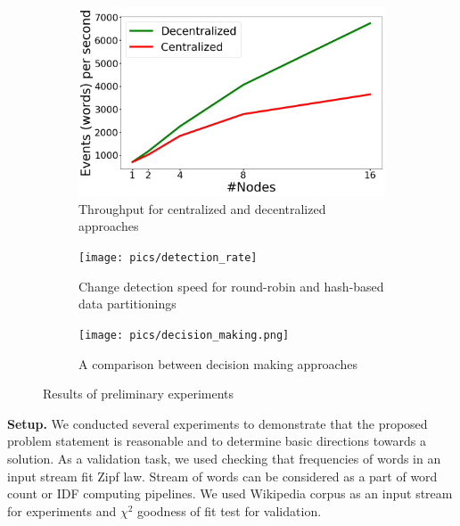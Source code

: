 \label {fs-short-experiments}

\begin{figure}[t!]
    \begin{subfigure}[b]{0.31\textwidth}
            \includegraphics[width=\linewidth]{pics/throughput}
            \caption{Throughput for centralized and decentralized approaches}
            \label{throughput}
    \end{subfigure}%
    \hspace{5mm}
    \begin{subfigure}[b]{0.31\textwidth}
            \texttt{[image: pics/detection\_rate]}
            \caption{Change detection speed for round-robin and hash-based data partitionings}
            \label{detection_rate}
    \end{subfigure}%
    \hspace{5mm}
    \begin{subfigure}[b]{0.31\textwidth}
            \texttt{[image: pics/decision\_making.png]}
            \caption{A comparison between decision making approaches}
            \label{decision_making}
    \end{subfigure}%
    \caption{Results of preliminary experiments}
\end{figure}


\indent

{\bf Setup.} We conducted several experiments to demonstrate that the proposed problem statement is reasonable and to determine basic directions towards a solution. As a validation task, we used checking that frequencies of words in an input stream fit Zipf law. Stream of words can be considered as a part of word count or IDF computing pipelines. We used Wikipedia corpus as an input stream for experiments and $\chi^{2}$ goodness of fit test for validation.


